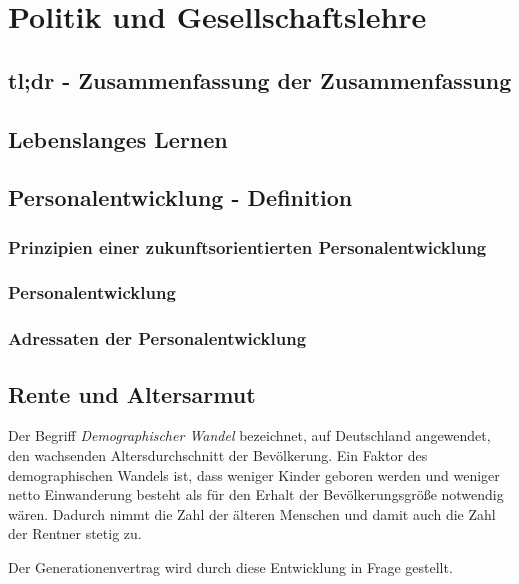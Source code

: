 \section{Politik und Gesellschaftslehre}

\subsection{tl;dr - Zusammenfassung der Zusammenfassung}

\subsection{Lebenslanges Lernen}


\subsection{Personalentwicklung - Definition}

\subsubsection{Prinzipien einer zukunftsorientierten Personalentwicklung}

\subsubsection{Personalentwicklung}

\subsubsection{Adressaten der Personalentwicklung}


\subsection{Rente und Altersarmut}

Der Begriff {\it Demographischer Wandel} bezeichnet, auf Deutschland angewendet, den wachsenden Altersdurchschnitt der Bevölkerung. Ein Faktor des demographischen Wandels ist, dass weniger Kinder geboren werden und weniger netto Einwanderung besteht als für den Erhalt der Bevölkerungsgröße notwendig wären. Dadurch nimmt die Zahl der älteren Menschen und damit auch die Zahl der Rentner stetig zu.

Der Generationenvertrag wird durch diese Entwicklung in Frage gestellt.


